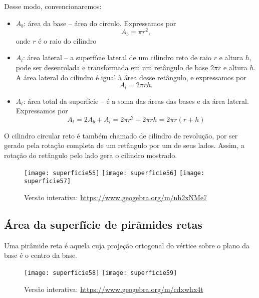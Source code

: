 Desse modo, convencionaremos:
\begin{itemize}
  \item $A_b$: área da base -- área do círculo. Expressamos por
  \begin{equation*}
  A_b=\pi r^2,
  \end{equation*}
  onde $r$ é o raio do cilindro

  \item $A_l$: área lateral -- a superfície lateral de um cilindro reto de raio $r$ e altura $h$, pode ser desenrolada e transformada em um retângulo de base $2\pi r$ e altura $h$. A área lateral do cilindro é igual à área desse retângulo, e expressamos por  
  \begin{equation*}
  A_l=2\pi rh.
  \end{equation*}
  \item $A_t$: área total da superfície -- é a soma das áreas das bases e da área lateral. Expressamos por 
  \begin{equation*}
  A_t=2A_b+A_l=2\pi r^2+2\pi rh=2\pi r(r+h)
  \end{equation*}
\end{itemize}

O cilindro circular reto é também chamado de cilindro de revolução, por ser gerado pela rotação completa de um retângulo por um de seus lados. Assim, a rotação do retângulo pelo lado gera o cilindro mostrado.

\begin{figure}[H]
\centering

\texttt{[image: superficie55]}
\hspace{.5em}
\texttt{[image: superficie56]}
\hspace{.5em}
\texttt{[image: superficie57]}

\caption{Versão interativa: \url{https://www.geogebra.org/m/nh2xNMe7}}
\end{figure}

\subsection{ Área da superfície de pirâmides retas}

Uma pirâmide reta é aquela cuja projeção ortogonal do vértice sobre o plano da base é o centro da base.

\begin{figure}[H]
\centering

\texttt{[image: superficie58]}
\hspace{.5em}
\texttt{[image: superficie59]}

\caption{Versão interativa: \url{https://www.geogebra.org/m/cdxwhx4t}}
\end{figure}

